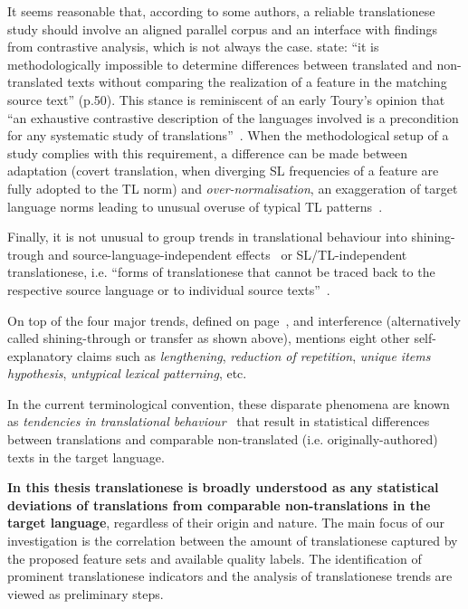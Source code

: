 It seems reasonable that, according to some authors, a reliable translationese study should involve an aligned parallel corpus and an interface with findings from contrastive analysis, which is not always the case. \citet{Evert2017} state: ``it is methodologically impossible to determine differences between translated and non-translated texts without comparing the realization of a feature in the matching source text'' (p.50). This stance is reminiscent of an early Toury's opinion that ``an exhaustive contrastive description of the languages involved is a precondition for any systematic study of translations''~\cite[p.29]{Toury1980}. When the methodological setup of a study complies with this requirement, a difference can be made between adaptation (covert translation, when diverging SL frequencies of a feature are fully adopted to the TL norm) and \textit{over-normalisation}, an exaggeration of target language norms leading to unusual overuse of typical TL patterns~\cite{Evert2017}. 

Finally, it is not unusual to group trends in translational behaviour into shining-trough and source-language-independent effects~\cite{Koppel2011} or SL/TL-independent translationese, i.e. ``forms of translationese that cannot be traced back to the respective source language or to individual source texts''~\cite[p.54]{Evert2017}.

On top of the four major trends, defined on page~\pageref{pg:major_trends}, and interference (alternatively called shining-through or transfer as shown above), \citet{Chesterman2004} mentions eight other self-explanatory claims such as \textit{lengthening}, \textit{reduction of repetition}, \textit{unique items hypothesis}, \textit{untypical lexical patterning}, etc.

In the current terminological convention, these disparate phenomena are known as \textit{tendencies in translational behaviour}~\cite[see the use of the term in][]{Laviosa2008, Cappelle2017} that result in statistical differences between translations and comparable non-translated (i.e. originally-authored) texts in the target language.

\textbf{In this thesis translationese is broadly understood as any statistical deviations of translations from comparable non-translations in the target language}, regardless of their origin and nature. The main focus of our investigation is the correlation between the amount of translationese captured by the proposed feature sets and available quality labels. The identification of prominent translationese indicators and the analysis of translationese trends are viewed as preliminary steps. 

